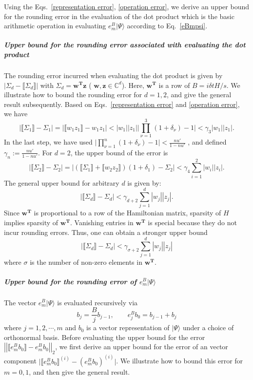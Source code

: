 \documentclass[12pt]{article}
\newcommand{\dket}[1]{|#1\rangle}
\renewcommand{\norm}[1]{\left|\left|#1\right|\right|}
\begin{document}
Using the Eqs.\ \eqref{representation error}, \eqref{operation error}, we derive an upper bound for the rounding error in the evaluation of the dot product which is the basic arithmetic operation in evaluating $e^B_m\dket{\Psi}$ according to Eq.\ \eqref{eBmpsi}.

\subparagraph{Upper bound for the rounding error associated with evaluating the dot product}
The rounding error incurred when evaluating the dot product is given by $|\Sigma_d-\llbracket \Sigma_d\rrbracket|$ with $\Sigma_d=\boldsymbol{w^\text{T}z}$ ( $\boldsymbol{w},\boldsymbol {z} \in\mathbb{C}^{d}$). Here, $\boldsymbol{w^\text{T}}$ is a row of $B=i\delta t H/s$. We illustrate how to bound the rounding error for $d=1,2$, and give the general result subsequently. Based on Eqs.\ \eqref{representation error} and \eqref{operation error}, we have
\begin{equation}
\label{c7}
    |\llbracket \Sigma_1\rrbracket-\Sigma_1|=|\llbracket w_1  z_1\rrbracket-w_1z_1|<|w_1||z_1|\big|\prod_{\nu=1}^3(1+\delta_\nu)-1\big|<\gamma_3 |w_1||z_1|.
\end{equation}
In the last step, we have used $\big|\prod_{\nu=1}^n(1+\delta_\nu)-1\big|<\frac{nu'}{1-nu'}$ \cite{higham2002accuracy}, and defined $\gamma_n:=\frac{nu'}{1-nu'}$. For $d=2$, the upper bound of the error is
\begin{equation}
\label{c8}
     |\llbracket \Sigma_2\rrbracket-\Sigma_2|=|(\llbracket \Sigma_1\rrbracket+\llbracket w_2 z_2\rrbracket )(1+\delta_1)-\Sigma_2|<\gamma_4\sum_{i=1}^2|w_i||z_i|.
\end{equation}
The general upper bound for arbitrary $d$ is given by:
\begin{equation}
    |\llbracket \Sigma_d\rrbracket-\Sigma_d| <\gamma_{d+2}\sum_{j=1}^{d}|w_j|| z_j|.
\end{equation}
Since $\boldsymbol{w^\text{T}}$ is proportional to a row of the Hamiltonian matrix, sparsity of $H$ implies sparsity of $\boldsymbol{w^\text{T}}$. Vanishing entries in $\boldsymbol{w^\text{T}}$ is special because they do not incur rounding errors. Thus, one can obtain a stronger upper bound
\begin{equation}
\label{C10}
    |\llbracket \Sigma_d\rrbracket-\Sigma_d|<\gamma_{\sigma+2}\sum_{j=1}^{d}|w_j|| z_j|
\end{equation}
where $\sigma$ is the number of non-zero elements in $\boldsymbol{w^\text{T}}$.

\subparagraph{Upper bound for the rounding error of  $e^B_m\dket{\Psi}$}
The vector $e^B_m\dket{\Psi}$ is evaluated recursively via
\begin{equation}
\label{recursive relation 1}
    b_j= \frac{B}{j}b_{j-1},\qquad e^B_j b_0=b_{j-1}+b_j
\end{equation}
where $j=1,2,\cdots,m$ and $b_0$ is a vector representation of $\dket{\Psi}$ under a choice of orthonormal basis. Before evaluating the upper bound for the error $\norm{\llbracket e^B_mb_0\rrbracket-e^B_mb_0}_2$, we first derive an upper bound for the error of an vector component $\big|\llbracket e^B_mb_0 \rrbracket^{(i)}-(e^B_mb_0) ^{(i)}\big|$. We illustrate how to bound this error for $m=0,1$, and then give the general result.
\end{document}
